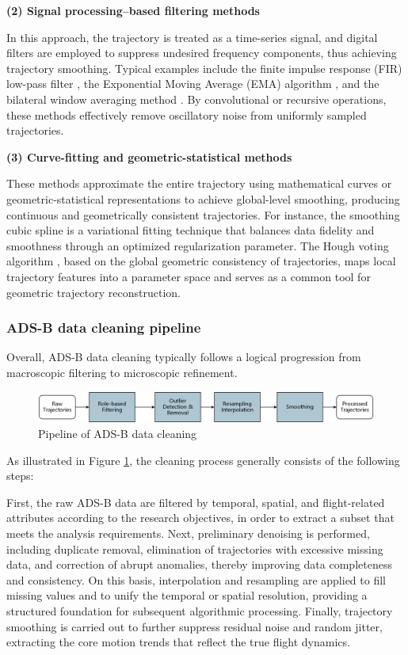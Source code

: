 \textbf{(2) Signal processing–based filtering methods}

In this approach, the trajectory is treated as a time-series signal, and digital filters are employed to suppress undesired frequency components, thus achieving trajectory smoothing.
Typical examples include the finite impulse response (FIR) low-pass filter \cite{churchill2019clustering}, the Exponential Moving Average (EMA) algorithm \cite{ZHU2023102473} , and the bilateral window averaging method \cite{7549107}. By convolutional or recursive operations, these methods effectively remove oscillatory noise from uniformly sampled trajectories.

\textbf{(3) Curve-fitting and geometric-statistical methods}

These methods approximate the entire trajectory using mathematical curves or geometric-statistical representations to achieve global-level smoothing, producing continuous and geometrically consistent trajectories.
For instance, the smoothing cubic spline \cite{alligier2018learning} is a variational fitting technique that balances data fidelity and smoothness through an optimized regularization parameter. The Hough voting algorithm \cite{LIU2024104652}, based on the global geometric consistency of trajectories, maps local trajectory features into a parameter space and serves as a common tool for geometric trajectory reconstruction.

\subsubsection{ADS-B data cleaning pipeline}

Overall, ADS-B data cleaning typically follows a logical progression from macroscopic filtering to microscopic refinement.
\begin{figure}
	\centering
	\includegraphics[width=0.8\linewidth]{pipeline}
	\caption[Figure 3]{Pipeline of ADS-B data cleaning}
	\label{fig:Pipeline}
\end{figure}

As illustrated in Figure \ref{fig:Pipeline}, the cleaning process generally consists of the following steps:

First, the raw ADS-B data are filtered by temporal, spatial, and flight-related attributes according to the research objectives, in order to extract a subset that meets the analysis requirements.
Next, preliminary denoising is performed, including duplicate removal, elimination of trajectories with excessive missing data, and correction of abrupt anomalies, thereby improving data completeness and consistency.
On this basis, interpolation and resampling are applied to fill missing values and to unify the temporal or spatial resolution, providing a structured foundation for subsequent algorithmic processing.
Finally, trajectory smoothing is carried out to further suppress residual noise and random jitter, extracting the core motion trends that reflect the true flight dynamics.

